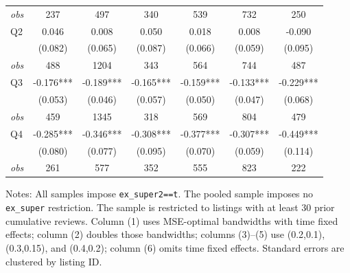 \begin{table}[!htbp]
\begin{tabular}{lcccccc}
\textit{obs} & 237 & 497 & 340 & 539 & 732 & 250 \\
Q2 & 0.046 & 0.008 & 0.050 & 0.018 & 0.008 & -0.090 \\
 & (0.082) & (0.065) & (0.087) & (0.066) & (0.059) & (0.095) \\
\textit{obs} & 488 & 1204 & 343 & 564 & 744 & 487 \\
Q3 & -0.176*** & -0.189*** & -0.165*** & -0.159*** & -0.133*** & -0.229*** \\
 & (0.053) & (0.046) & (0.057) & (0.050) & (0.047) & (0.068) \\
\textit{obs} & 459 & 1345 & 318 & 569 & 804 & 479 \\
Q4 & -0.285*** & -0.346*** & -0.308*** & -0.377*** & -0.307*** & -0.449*** \\
 & (0.080) & (0.077) & (0.095) & (0.070) & (0.059) & (0.114) \\
\textit{obs} & 261 & 577 & 352 & 555 & 823 & 222 \\
\bottomrule
\end{tabular}
\begin{minipage}{0.98\textwidth}\footnotesize
Notes: All samples impose \texttt{ex\_super2==t}. The pooled sample imposes no \texttt{ex\_super} restriction. The sample is restricted to listings with at least 30 prior cumulative reviews. Column (1) uses MSE-optimal bandwidths with time fixed effects; column (2) doubles those bandwidths; columns (3)--(5) use (0.2,0.1), (0.3,0.15), and (0.4,0.2); column (6) omits time fixed effects. Standard errors are clustered by listing ID.
\end{minipage}
\end{table}


